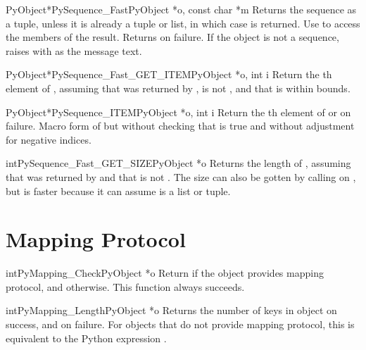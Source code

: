 \begin{cfuncdesc}{PyObject*}{PySequence_Fast}{PyObject *o, const char *m}
  Returns the sequence  as a tuple, unless it is already a
  tuple or list, in which case  is returned.  Use
   to access the members of the
  result.  Returns \NULL{} on failure.  If the object is not a
  sequence, raises  with  as the message
  text.
\end{cfuncdesc}

\begin{cfuncdesc}{PyObject*}{PySequence_Fast_GET_ITEM}{PyObject *o, int i}
  Return the th element of , assuming that  was
  returned by ,  is not \NULL,
  and that  is within bounds.
\end{cfuncdesc}

\begin{cfuncdesc}{PyObject*}{PySequence_ITEM}{PyObject *o, int i}
  Return the th element of  or \NULL on failure.
  Macro form of  but without checking
  that  is true and without
  adjustment for negative indices.
\end{cfuncdesc}

\begin{cfuncdesc}{int}{PySequence_Fast_GET_SIZE}{PyObject *o}
  Returns the length of , assuming that  was
  returned by  and that  is
  not \NULL.  The size can also be gotten by calling
   on , but
   is faster because it can
  assume  is a list or tuple.
\end{cfuncdesc}


\section{Mapping Protocol \label{mapping}}

\begin{cfuncdesc}{int}{PyMapping_Check}{PyObject *o}
  Return  if the object provides mapping protocol, and
   otherwise.  This function always succeeds.
\end{cfuncdesc}


\begin{cfuncdesc}{int}{PyMapping_Length}{PyObject *o}
  Returns the number of keys in object  on success, and
   on failure.  For objects that do not provide mapping
  protocol, this is equivalent to the Python expression
  .
\end{cfuncdesc}


